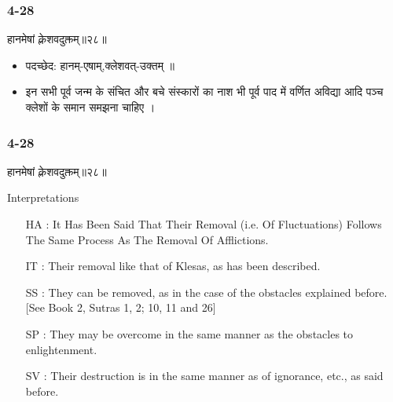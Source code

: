 \begin{frame}[fragile]\frametitle{4-28}
\begin{sanskrit}
हानमेषां क्लेशवदुक्तम्॥२८॥
\end{sanskrit}

\begin{itemize}
\item पदच्छेद:  हानम्-एषाम्,क्लेशवत्-उक्तम् ॥
\item इन सभी पूर्व जन्म के संचित और बचे संस्कारों का नाश भी पूर्व पाद में वर्णित अविद्या आदि पञ्च क्लेशों के समान समझना चाहिए ।
\end{itemize}
\end{frame}


\begin{frame}[fragile]\frametitle{4-28}
\begin{sanskrit}
हानमेषां क्लेशवदुक्तम्॥२८॥
\end{sanskrit}

Interpretations
\begin{itemize}	
\item [HA]: It Has Been Said That Their Removal (i.e. Of Fluctuations) Follows The Same Process As The Removal Of Afflictions.
\item [IT]: Their removal like that of Klesas, as has been described.
\item [SS]: They can be removed, as in the case of the obstacles explained before. [See Book 2, Sutras 1, 2; 10, 11 and 26]
\item [SP]: They may be overcome in the same manner as the obstacles to enlightenment.
\item [SV]: Their destruction is in the same manner as of ignorance, etc., as said before. 
\end{itemize}
\end{frame}

